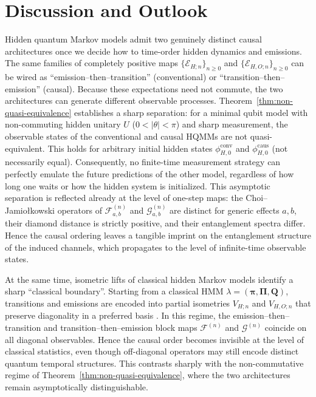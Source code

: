 \documentclass[11pt, reco]{article}
\begin{document}
\section{Discussion and Outlook}\label{Sec-disc}

Hidden quantum Markov models admit two genuinely distinct causal architectures once we decide how to time-order hidden dynamics and emissions. The same families of completely positive maps $\{\mathcal{E}_{H;n}\}_{n\ge 0}$ and $\{\mathcal{E}_{H,O;n}\}_{n\ge 0}$ can be wired as ``emission–then–transition'' (conventional) or ``transition–then–emission'' (causal). Because these expectations need not commute, the two architectures can generate different observable processes. Theorem~\ref{thm:non-quasi-equivalence} establishes a sharp separation: for a minimal qubit model with non-commuting hidden unitary $U$ ($0<|\theta|<\pi$) and sharp measurement, the observable states of the conventional and causal HQMMs are not quasi-equivalent. This holds for arbitrary initial hidden states $\phi_{H,0}^{\mathrm{conv}}$ and $\phi_{H,0}^{\mathrm{caus}}$ (not necessarily equal). Consequently, no finite-time measurement strategy can perfectly emulate the future predictions of the other model, regardless of how long one waits or how the hidden system is initialized. This asymptotic separation is reflected already at the level of one-step maps: the Choi–Jamio{\l}kowski operators of $\mathcal{F}^{(n)}_{a,b}$ and $\mathcal{G}^{(n)}_{a,b}$ are distinct for generic effects $a,b$, their diamond distance is strictly positive, and their entanglement spectra differ. Hence the causal ordering leaves a tangible imprint on the entanglement structure of the induced channels, which propagates to the level of infinite-time observable states.

At the same time, isometric lifts of classical hidden Markov models identify a sharp ``classical boundary''. Starting from a classical HMM $\lambda = (\boldsymbol{\pi}, \mathbf{\Pi}, \mathbf{Q})$, transitions and emissions are encoded into partial isometries $V_{H;n}$ and $V_{H,O;n}$ that preserve diagonality in a preferred basis \cite{ASS20,SS23}. In this regime, the emission–then–transition and transition–then–emission block maps $\mathcal{F}^{(n)}$ and $\mathcal{G}^{(n)}$ coincide on all diagonal observables. Hence the causal order becomes invisible at the level of classical statistics, even though off-diagonal operators may still encode distinct quantum temporal structures. This contrasts sharply with the non-commutative regime of Theorem~\ref{thm:non-quasi-equivalence}, where the two architectures remain asymptotically distinguishable.
\end{document}
